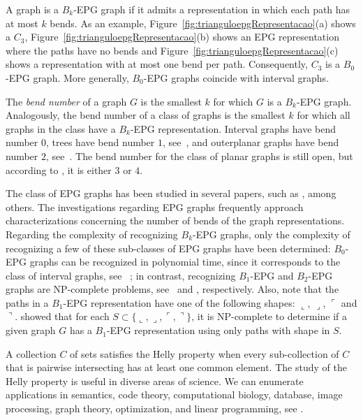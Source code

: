 A graph is a $ B_k$-EPG graph if it admits a representation in which each path has at most $k$ bends. As an example, Figure~\ref{fig:trianguloepgRepresentacao}(a) shows a $C_3$, Figure~\ref{fig:trianguloepgRepresentacao}(b) shows an EPG representation where the paths have no bends and Figure~\ref{fig:trianguloepgRepresentacao}(c) shows a representation with at most one bend per path.   
Consequently, $C_3$ is a $B_0$-EPG graph. More generally, $B_0$-EPG graphs coincide with interval graphs.



The \emph{bend number} of a graph $G$ is the smallest $k$ for which $G$ is a $B_k$-EPG graph. Analogously, the bend number of a class of graphs is the smallest $k$ for which all graphs in the class have a $B_k$-EPG representation. Interval graphs have bend number $0$, trees have bend number $1$, see~\cite{golumbic2009}, and outerplanar graphs have bend number $2$, see~\cite{daniel2014b}. The bend number for the class of planar graphs is still open, but according to \cite{daniel2014b}, it is either $3$ or $4$.

The class of EPG graphs has been studied in several papers, such as \cite{alcon2016, Asinowski2009, cohen2014, golumbic2009, heldt2014,  martin2017,golumbic2019edge}, among others. The investigations regarding EPG graphs frequently approach characterizations concerning the number of bends of the graph representations. Regarding the complexity of recognizing $B_k$-EPG graphs, only the complexity of recognizing a few of these sub-classes of EPG graphs have been determined: $B_0$-EPG graphs can be recognized in polynomial time, since it corresponds to the class of interval graphs, see ~\cite{booth1976}; in contrast, recognizing $B_1$-EPG and $B_2$-EPG graphs are NP-complete problems, see~\cite{heldt2014} and \cite{martin2017}, respectively. 
Also, note that the paths in a $B_1$-EPG representation have one of the following shapes: $\llcorner$, $\lrcorner$, $\ulcorner$ and $\urcorner$. \cite{cameron2016edge} showed that for each $S\subset \{\llcorner, \lrcorner, \ulcorner, \urcorner\}$, it is NP-complete to determine if a given graph $G$ has a $B_1$-EPG representation using only paths with shape in $S$.

A  collection $C$ of sets satisfies the Helly property when every sub-collection of $C$ that is pairwise intersecting has at least one common element. 
The study of the Helly property is useful in diverse areas of science. We can enumerate applications in semantics, code theory, computational biology, database, image processing, graph theory, optimization, and linear programming, see \cite{dourado2009}.

